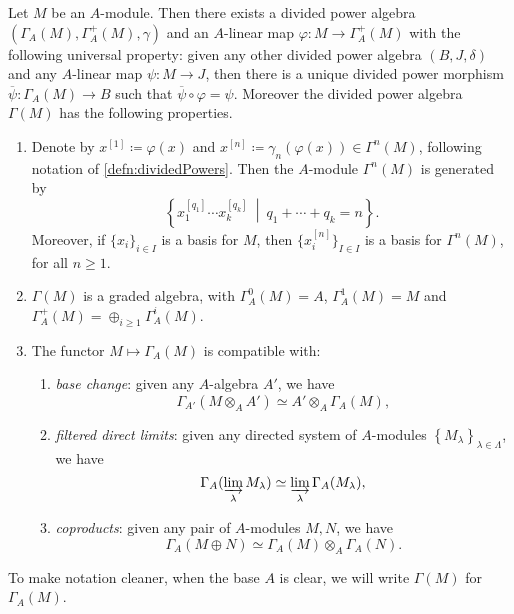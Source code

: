 \begin{thm}\label{thm:PDSymAlg}
	Let $M$ be an $A$-module.
	Then there exists a divided power algebra 
	$\left(\Gamma_A(M), \Gamma_A^+(M), \gamma\right)$ and an $A$-linear
	map $\varphi\colon M \to \Gamma_A^+(M)$ with the following
	universal property:
	given any other divided power algebra
	$\left(B, J, \delta\right)$ and any $A$-linear
	map $\psi\colon M \to J$,
	then there is a unique divided power morphism
	$\overline{\psi}\colon \Gamma_A(M) \to B$
	such that $\overline{\psi} \circ \varphi = \psi$.
	Moreover the divided power algebra $\Gamma(M)$ 
	has the following properties.
\begin{enumerate}
	\item Denote by $x^{[1]} \coloneqq \varphi(x)$ and $x^{[n]} \coloneqq \gamma_n(\varphi(x)) \in
		\Gamma^n(M)$, following notation of \cref{defn:dividedPowers}.
		Then the $A$-module $\Gamma^n(M)$ is generated by
		\begin{equation*}
		\left\{ x_1^{[q_1]} \cdots x_k^{[q_k]} \ \middle|\ 
		q_1 + \cdots + q_k = n \right\}
		.\end{equation*}
		Moreover, if $\{ x_i \}_{i \in I}$ is a basis
		for $M$, then $\{ x^{[n]}_i \}_{I \in I}$
		is a basis for $\Gamma^n(M)$,
		for all $n \geq 1$.

	\item $\Gamma(M)$ is a graded algebra, with
		$\Gamma_A^0(M) = A$, $\Gamma_A^1(M) = M$
		and $\Gamma_A^+(M) = \oplus_{i \geq 1} \Gamma_A^i(M)$.

	\item The functor $M \mapsto \Gamma_A(M)$ is compatible with:
		\begin{enumerate}
			\item \emph{base change}: given any $A$-algebra $A'$,
				we have
				\begin{equation*}
					\Gamma_{A'}(M \otimes_A A') \simeq A' \otimes_A \Gamma_A(M)
				,\end{equation*}

			\item \emph{filtered direct limits}: given any directed system
				of $A$-modules $\left\{ M_\lambda \right\}_{\lambda \in \Lambda}$, we have
				\begin{equation*}
					\Gamma_A(\varinjlim_\lambda M_\lambda) \simeq
					\varinjlim_\lambda \Gamma_A(M_\lambda)
				,\end{equation*}
				
			\item \emph{coproducts}: given any pair of $A$-modules $M,N$, we have
				\begin{equation*}
					\Gamma_A(M \oplus N) \simeq
					\Gamma_A(M) \otimes_A \Gamma_A(N)
				.\end{equation*}
		\end{enumerate}
\end{enumerate}
	To make notation cleaner, when the base $A$ is clear, we
	will write $\Gamma(M)$ for $\Gamma_A(M)$.
\end{thm}


